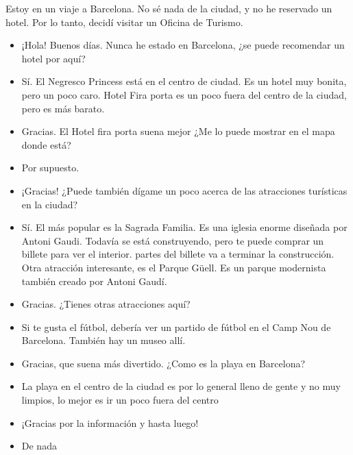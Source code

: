 \documentclass[a4paper]{article}
\date{}
\begin{document}
\thispagestyle{fancy}
    Estoy en un viaje a Barcelona. No sé nada de la ciudad, y no he reservado un     hotel. Por lo tanto, decidí visitar un Oficina de Turismo.

\begin{itemize}

    \item ¡Hola! Buenos días. Nunca he estado en Barcelona, ¿se puede recomendar un hotel por aquí?
    \item Sí. El Negresco Princess está en el centro de ciudad. Es un hotel muy bonita, pero un poco caro. Hotel Fira porta es un poco fuera del centro de la ciudad, pero es más barato.
    \item Gracias. El Hotel fira porta suena mejor ¿Me lo puede mostrar en el mapa donde está?
    \item Por supuesto.
    \item ¡Gracias! ¿Puede también dígame un poco acerca de las atracciones turísticas en la ciudad?
    \item Sí. El más popular es la Sagrada Familia. Es una iglesia enorme diseñada por Antoni Gaudi. Todavía se está construyendo, pero te puede comprar un billete para ver el interior. partes del billete va a terminar la construcción. Otra atracción interesante, es el Parque Güell.  Es un parque modernista también creado por Antoni Gaudí.  
    \item Gracias. ¿Tienes otras atracciones aquí? 
    \item Si te gusta el fútbol, debería ver un partido de fútbol en el Camp Nou de Barcelona. También hay un museo allí.
    \item Gracias, que suena más divertido. ¿Como es la playa en Barcelona?
    \item La playa en el centro de la ciudad es por lo general lleno de gente y no muy limpios, lo mejor es ir un poco fuera del centro
    \item ¡Gracias por la información y hasta luego!
    \item De nada
\end{itemize}
\end{document}
